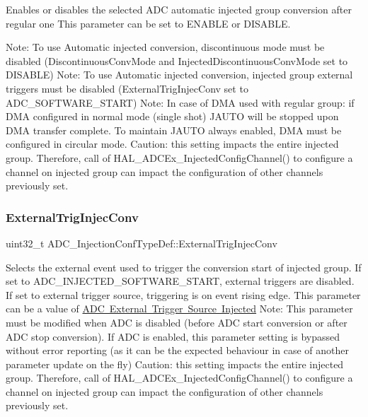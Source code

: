Enables or disables the selected A\+DC automatic injected group conversion after regular one This parameter can be set to E\+N\+A\+B\+LE or D\+I\+S\+A\+B\+LE.

Note\+: To use Automatic injected conversion, discontinuous mode must be disabled (\textquotesingle{}Discontinuous\+Conv\+Mode\textquotesingle{} and \textquotesingle{}Injected\+Discontinuous\+Conv\+Mode\textquotesingle{} set to D\+I\+S\+A\+B\+LE) Note\+: To use Automatic injected conversion, injected group external triggers must be disabled (\textquotesingle{}External\+Trig\+Injec\+Conv\textquotesingle{} set to A\+D\+C\+\_\+\+S\+O\+F\+T\+W\+A\+R\+E\+\_\+\+S\+T\+A\+RT) Note\+: In case of D\+MA used with regular group\+: if D\+MA configured in normal mode (single shot) J\+A\+U\+TO will be stopped upon D\+MA transfer complete. To maintain J\+A\+U\+TO always enabled, D\+MA must be configured in circular mode. Caution\+: this setting impacts the entire injected group. Therefore, call of H\+A\+L\+\_\+\+A\+D\+C\+Ex\+\_\+\+Injected\+Config\+Channel() to configure a channel on injected group can impact the configuration of other channels previously set. \mbox{\label{struct_a_d_c___injection_conf_type_def_ac3431d4d3e3089f0db271bfb06dbffc0}} 
\subsubsection{\texorpdfstring{ExternalTrigInjecConv}{ExternalTrigInjecConv}}
{\footnotesize\ttfamily uint32\+\_\+t A\+D\+C\+\_\+\+Injection\+Conf\+Type\+Def\+::\+External\+Trig\+Injec\+Conv}

Selects the external event used to trigger the conversion start of injected group. If set to A\+D\+C\+\_\+\+I\+N\+J\+E\+C\+T\+E\+D\+\_\+\+S\+O\+F\+T\+W\+A\+R\+E\+\_\+\+S\+T\+A\+RT, external triggers are disabled. If set to external trigger source, triggering is on event rising edge. This parameter can be a value of \mbox{\hyperlink{group___a_d_c_ex___external__trigger___source___injected}{A\+DC External Trigger Source Injected}} Note\+: This parameter must be modified when A\+DC is disabled (before A\+DC start conversion or after A\+DC stop conversion). If A\+DC is enabled, this parameter setting is bypassed without error reporting (as it can be the expected behaviour in case of another parameter update on the fly) Caution\+: this setting impacts the entire injected group. Therefore, call of H\+A\+L\+\_\+\+A\+D\+C\+Ex\+\_\+\+Injected\+Config\+Channel() to configure a channel on injected group can impact the configuration of other channels previously set. \mbox{\label{struct_a_d_c___injection_conf_type_def_a4f2cfa808b5ace1e47fc3f94da7b850f}} 
